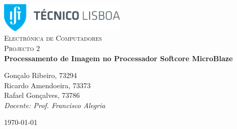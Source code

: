\begin{titlepage}

	\begin{center}

		\includegraphics[width=6cm]{./title}\\[3cm]

		\textsc{\LARGE Electrónica de Computadores}\\[1.5cm]

		\textsc{\Large Projecto 2}\\[1.5cm]


		{ \huge \bfseries Processamento de Imagem no Processador Softcore MicroBlaze\\[2.5cm] }


		\noindent
		\begin{center} \large
			Gonçalo Ribeiro, 73294\\[5mm]

			Ricardo Amendoeira, 73373\\[5mm]

			Rafael Gonçalves, 73786\\[2.5cm]

			\textit{Docente: Prof. Francisco Alegria}

		\end{center}

		\vfill

		{\large \today}

	\end{center}

\end{titlepage}